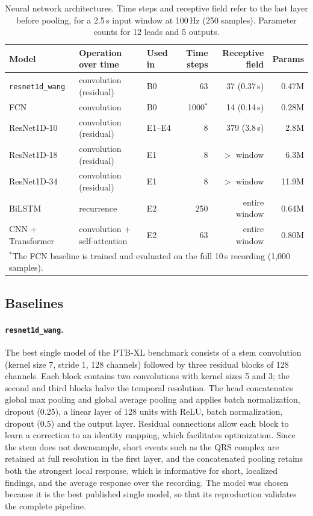 \documentclass{article}
\newcommand{\wang}{\texttt{resnet1d\_wang}}
\begin{document}
\begin{table}[htb]
  \caption{Neural network architectures. Time steps and receptive field refer to the last layer before pooling, for a 2.5\,s input window at 100\,Hz (250 samples). Parameter counts for 12 leads and 5 outputs.}
  \label{tab:models}
  \centering\small
  \begin{tabular}{lllrrr}
    \toprule
    Model & Operation over time & Used in & Time steps & Receptive field & Params \\
    \midrule
    \wang{} & convolution (residual) & B0 & 63 & 37 (0.37\,s) & 0.47M \\
    FCN & convolution & B0 & 1000$^{\ast}$ & 14 (0.14\,s) & 0.28M \\
    ResNet1D-10 & convolution (residual) & E1--E4 & 8 & 379 (3.8\,s) & 2.8M \\
    ResNet1D-18 & convolution (residual) & E1 & 8 & $>$ window & 6.3M \\
    ResNet1D-34 & convolution (residual) & E1 & 8 & $>$ window & 11.9M \\
    BiLSTM & recurrence & E2 & 250 & entire window & 0.64M \\
    CNN + Transformer & convolution + self-attention & E2 & 63 & entire window & 0.80M \\
    \bottomrule
    \multicolumn{6}{l}{\footnotesize $^{\ast}$The FCN baseline is trained and evaluated on the full 10\,s recording (1,000 samples).}
  \end{tabular}
\end{table}

\subsection{Baselines}

\paragraph{\wang{}.} The best single model of the PTB-XL benchmark \citep{wang2017,strodthoff2021} consists of a stem convolution (kernel size 7, stride 1, 128 channels) followed by three residual blocks of 128 channels. Each block contains two convolutions with kernel sizes 5 and 3; the second and third blocks halve the temporal resolution. The head concatenates global max pooling and global average pooling and applies batch normalization, dropout (0.25), a linear layer of 128 units with ReLU, batch normalization, dropout (0.5) and the output layer. Residual connections \citep{he2016} allow each block to learn a correction to an identity mapping, which facilitates optimization. Since the stem does not downsample, short events such as the QRS complex are retained at full resolution in the first layer, and the concatenated pooling retains both the strongest local response, which is informative for short, localized findings, and the average response over the recording. The model was chosen because it is the best published single model, so that its reproduction validates the complete pipeline.
\end{document}
